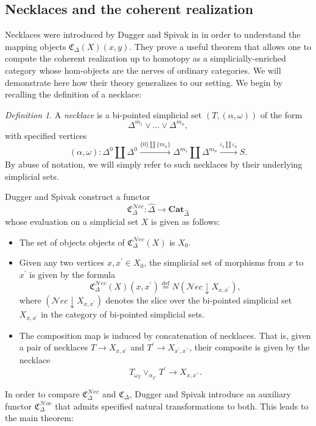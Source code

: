\documentclass[leqno]{article}
\numberwithin{equation}{subsection}
\theoremstyle{plain}   %
\theoremstyle{remark}
\newtheorem{defn}[equation]{Definition}
\theoremstyle{plain}
\newcommand{\Nec}{\ensuremath{{\mathcal{N}ec}}}
\newcommand{\Hoc}{\ensuremath{{\mathcal{H}oc}}}
\newcommand{\Cat}{\ensuremath{\mathbf{Cat}}}
\newcommand{\overcat}[2]{{\left(#1\downarrow #2\right)}}
\newcommand{\psh}[1]{\ensuremath{\widehat{#1}}}
\newcommand{\defeq}{\overset{\mathrm{def}}=}
\begin{document}
\subsection{Necklaces and the coherent realization}
Necklaces were introduced by Dugger and Spivak in \cite{ds1} in order to understand the mapping objects \(\mathfrak{C}_\Delta(X)(x,y)\).  They prove a useful theorem that allows one to compute the coherent realization up to homotopy as a simplicially-enriched category whose hom-objects are the nerves of ordinary categories.  We will demonstrate here how their theory generalizes to our setting. We begin by recalling the definition of a necklace:

\begin{defn}
	A \emph{necklace} is a bi-pointed simplicial set \((T,(\alpha,\omega))\) of the form
	\[
		\Delta^{m_1} \vee \dots \vee \Delta^{m_n},
	\]
	with specified vertices 
	\[(\alpha,\omega):\Delta^0\coprod \Delta^0 \xrightarrow{\{0\}\coprod \{m_n\}} \Delta^{m_1} \coprod \Delta^{m_n}\xrightarrow{\iota_1\coprod \iota_n} S.\]
	By abuse of notation, we will simply refer to such necklaces by their underlying simplicial sets.
\end{defn}

Dugger and Spivak construct a functor
\[
	\mathfrak{C}^{\Nec}_\Delta: \psh{\Delta}\to \Cat_{\psh{\Delta}}
\]
whose evaluation on a simplicial set \(X\) is given as follows:
\begin{itemize}
	\item The set of objects objects of \(\mathfrak{C}^{\Nec}_\Delta(X)\) is \(X_0\).
	\item Given any two vertices \(x,x^\prime\in X_0\), the simplicial set of morphisms from \(x\) to \(x^\prime\) is given by the formula 
	\[
		\mathfrak{C}^{\Nec}_\Delta(X)(x,x^\prime)\defeq N\overcat{\Nec}{X_{x,x^\prime}},
	\]
	where \(\overcat{\Nec}{X_{x,x^\prime}}\) denotes the slice over the bi-pointed simplicial set \(X_{x,x^\prime}\) in the category of bi-pointed simplicial sets.  
	\item The composition map is induced by concatenation of necklaces.  That is, given a pair of necklaces \(T\to X_{x,x^\prime}\) and \(T^\prime\to X_{x^\prime,x^{\prime\prime}}\), their composite is given by the necklace 
	\[
		T {}_{\omega_T}\vee_{\alpha_{T^\prime}} T^\prime \to X_{x,x^{\prime\prime}}.
	\]
\end{itemize}

In order to compare \(\mathfrak{C}^{\Nec}_\Delta\) and \(\mathfrak{C}_\Delta\), Dugger and Spivak introduce an auxiliary functor \(\mathfrak{C}^{\Hoc}_\Delta\) that admits specified natural transformations to both.  This leads to the main theorem:
\end{document}
